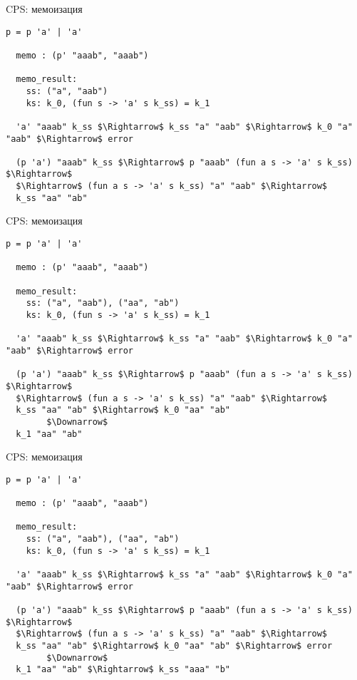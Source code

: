 \documentclass[10pt, mathserif]{beamer}
\theoremstyle{definition}
\begin{document}
\begin{frame}[fragile]{CPS: мемоизация}

\begin{lstlisting}[basicstyle=\small]
  p = p 'a' | 'a'

  memo : (p' "aaab", "aaab")

  memo_result:
    ss: ("a", "aab")
    ks: k_0, (fun s -> 'a' s k_ss) = k_1

  'a' "aaab" k_ss $\Rightarrow$ k_ss "a" "aab" $\Rightarrow$ k_0 "a" "aab" $\Rightarrow$ error

  (p 'a') "aaab" k_ss $\Rightarrow$ p "aaab" (fun a s -> 'a' s k_ss) $\Rightarrow$
  $\Rightarrow$ (fun a s -> 'a' s k_ss) "a" "aab" $\Rightarrow$
  k_ss "aa" "ab"
\end{lstlisting}

\end{frame}

\begin{frame}[fragile]{CPS: мемоизация}

\begin{lstlisting}[basicstyle=\small]
  p = p 'a' | 'a'

  memo : (p' "aaab", "aaab")

  memo_result:
    ss: ("a", "aab"), ("aa", "ab")
    ks: k_0, (fun s -> 'a' s k_ss) = k_1

  'a' "aaab" k_ss $\Rightarrow$ k_ss "a" "aab" $\Rightarrow$ k_0 "a" "aab" $\Rightarrow$ error

  (p 'a') "aaab" k_ss $\Rightarrow$ p "aaab" (fun a s -> 'a' s k_ss) $\Rightarrow$
  $\Rightarrow$ (fun a s -> 'a' s k_ss) "a" "aab" $\Rightarrow$
  k_ss "aa" "ab" $\Rightarrow$ k_0 "aa" "ab"
        $\Downarrow$
  k_1 "aa" "ab"
\end{lstlisting}

\end{frame}

\begin{frame}[fragile]{CPS: мемоизация}

\begin{lstlisting}[basicstyle=\small]
  p = p 'a' | 'a'

  memo : (p' "aaab", "aaab")

  memo_result:
    ss: ("a", "aab"), ("aa", "ab")
    ks: k_0, (fun s -> 'a' s k_ss) = k_1

  'a' "aaab" k_ss $\Rightarrow$ k_ss "a" "aab" $\Rightarrow$ k_0 "a" "aab" $\Rightarrow$ error

  (p 'a') "aaab" k_ss $\Rightarrow$ p "aaab" (fun a s -> 'a' s k_ss) $\Rightarrow$
  $\Rightarrow$ (fun a s -> 'a' s k_ss) "a" "aab" $\Rightarrow$
  k_ss "aa" "ab" $\Rightarrow$ k_0 "aa" "ab" $\Rightarrow$ error
        $\Downarrow$
  k_1 "aa" "ab" $\Rightarrow$ k_ss "aaa" "b"
\end{lstlisting}

\end{frame}
\end{document}
